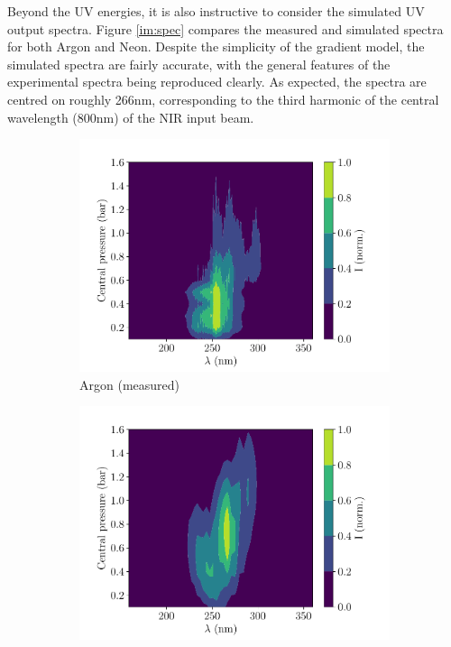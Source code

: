 \documentclass[a4paper]{jpconf}
\begin{document}
Beyond the UV energies, it is also instructive to consider the simulated UV output spectra. Figure \ref{im:spec} compares the measured and simulated spectra for both Argon and Neon. Despite the simplicity of the gradient model, the simulated spectra are fairly accurate, with the general features of the experimental spectra being reproduced clearly. As expected, the spectra are centred on roughly 266nm, corresponding to the third harmonic of the central wavelength (800nm) of the NIR input beam. \par  
\begin{figure}[h]
\centering
 \begin{subfigure}{0.49\textwidth}
        \includegraphics[width=\textwidth]{im/2d_spectra_pres_Ar_150mW_meas}
    \caption{Argon (measured)}
    \end{subfigure}
    \begin{subfigure}{0.49\textwidth}
        \includegraphics[width=\textwidth]{im/2d_Ar_sim}

\end{subfigure}
\end{figure}
\end{document}

